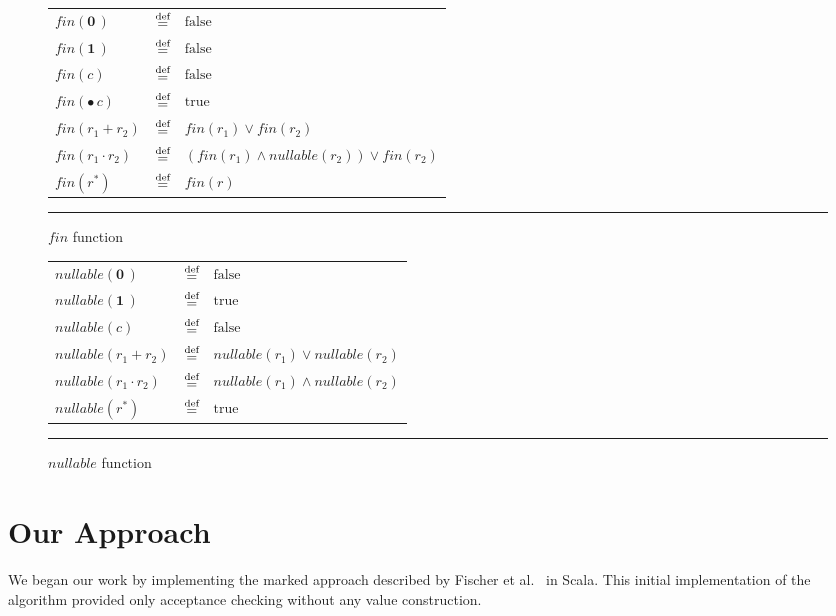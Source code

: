 \documentclass[12pt]{article}
\newcommand{\dn}{\ensuremath{\stackrel{\mbox{\scriptsize def}}{=}}}
\newcommand{\ZERO}{\textbf{0}}
\newcommand{\ONE}{\textbf{1}}
\newcommand{\Marked}[1]{\bullet\,#1}
\newcommand{\fin}{\textit{fin}}
\newcommand{\nullable}{\textit{nullable}}
\begin{document}
\begin{figure}[ht]
  \begin{center}
    \renewcommand{\arraystretch}{1.5}
    \begin{tabular}{lcl}
      $\fin(\ZERO\,)$            & \dn & $\text{false}$ \\
      $\fin(\ONE\,)$             & \dn & $\text{false}$ \\
      $\fin(c)$                  & \dn & $\text{false}$ \\
      $\fin(\Marked{c})$         & \dn & $\text{true}$ \\
      $\fin(r_1 + r_2)$          & \dn & $\fin(r_1) \lor \fin(r_2)$ \\ 
      $\fin(r_1 \cdot r_2)$      & \dn & $(\fin(r_1) \land \nullable(r_2)) \lor \fin(r_2)$ \\
      $\fin(r^*)$                & \dn & $\fin(r)$  
    \end{tabular}
    \renewcommand{\arraystretch}{1.0}

    \mbox{}
    \rule{\linewidth}{0.4pt}
    \caption{$\fin$ function}\label{finFunction}
  \end{center}
\end{figure}

\begin{figure}[ht]
  \begin{center}
    \renewcommand{\arraystretch}{1.5}
    \begin{tabular}{lcl}
      $\nullable(\ZERO\,)$         & \dn & $\text{false}$ \\
      $\nullable(\ONE\,)$          & \dn & $\text{true}$ \\
      $\nullable(c)$               & \dn & $\text{false}$ \\
      $\nullable(r_1 + r_2)$       & \dn & $\nullable(r_1) \lor \nullable(r_2)$ \\ 
      $\nullable(r_1 \cdot r_2)$   & \dn & $\nullable(r_1) \land \nullable(r_2)$ \\
      $\nullable(r^*)$             & \dn & $\text{true}$
    \end{tabular}
    \renewcommand{\arraystretch}{1.0}
    
    \mbox{}
    \rule{\linewidth}{0.4pt}
    \caption{$\nullable$ function}\label{nullableFunction}
  \end{center}
\end{figure}

\FloatBarrier
\section{Our Approach}
We began our work by implementing the marked approach described by Fischer et al.~\cite{Fischer2010} in Scala. 
This initial implementation of the algorithm provided only acceptance checking without any value construction.  
\end{document}
